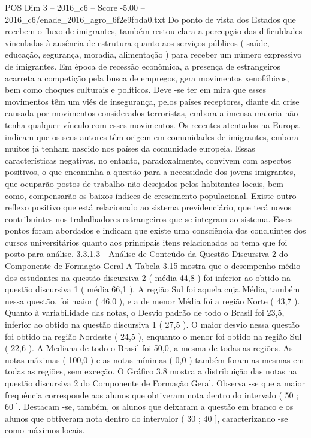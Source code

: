 \begin{textsample}{POS Dim 3 – 2016\_c6 – Score -5.00 – 2016\_c6/enade\_2016\_agro\_6f2e9fbda0.txt}
Do ponto de vista dos Estados que recebem o fluxo de imigrantes, também restou clara a percepção das dificuldades vinculadas à ausência de estrutura quanto aos serviços públicos ( saúde, educação, segurança, moradia, alimentação ) para receber um número expressivo de imigrantes.
Em época de recessão econômica, a presença de estrangeiros acarreta a competição pela busca de empregos, gera movimentos xenofóbicos, bem como choques culturais e políticos.
Deve -se ter em mira que esses movimentos têm um viés de insegurança, pelos países receptores, diante da crise causada por movimentos considerados terroristas, embora a imensa maioria não tenha qualquer vínculo com esses movimentos.
Os recentes atentados na Europa indicam que os seus autores têm origem em comunidades de imigrantes, embora muitos já tenham nascido nos países da comunidade europeia.
Essas características negativas, no entanto, paradoxalmente, convivem com aspectos positivos, o que encaminha a questão para a necessidade dos jovens imigrantes, que ocuparão postos de trabalho não desejados pelos habitantes locais, bem como, compensarão os baixos índices de crescimento populacional.
Existe outro reflexo positivo que está relacionado ao sistema previdenciário, que terá novos contribuintes nos trabalhadores estrangeiros que se integram ao sistema.
Esses pontos foram abordados e indicam que existe uma consciência dos concluintes dos cursos universitários quanto aos principais itens relacionados ao tema que foi posto para análise. 3.3.1.3 - Análise de Conteúdo da Questão Discursiva 2 do Componente de Formação Geral A Tabela 3.15 mostra que o desempenho médio dos estudantes na questão discursiva 2 ( média 44,8 ) foi inferior ao obtido na questão discursiva 1 ( média 66,1 ).
A região Sul foi aquela cuja Média, também nessa questão, foi maior ( 46,0 ), e a de menor Média foi a região Norte ( 43,7 ).
Quanto à variabilidade das notas, o Desvio padrão de todo o Brasil foi 23,5, inferior ao obtido na questão discursiva 1 ( 27,5 ).
O maior desvio nessa questão foi obtido na região Nordeste ( 24,5 ), enquanto o menor foi obtido na região Sul ( 22,6 ).
A Mediana de todo o Brasil foi 50,0, a mesma de todas as regiões.
As notas máximas ( 100,0 ) e as notas mínimas ( 0,0 ) também foram as mesmas em todas as regiões, sem exceção.
O Gráfico 3.8 mostra a distribuição das notas na questão discursiva 2 do Componente de Formação Geral.
Observa -se que a maior frequência corresponde aos alunos que obtiveram nota dentro do intervalo ( 50 ; 60 ].
Destacam -se, também, os alunos que deixaram a questão em branco e os alunos que obtiveram nota dentro do intervalor ( 30 ; 40 ], caracterizando -se como máximos locais.

\end{textsample}
